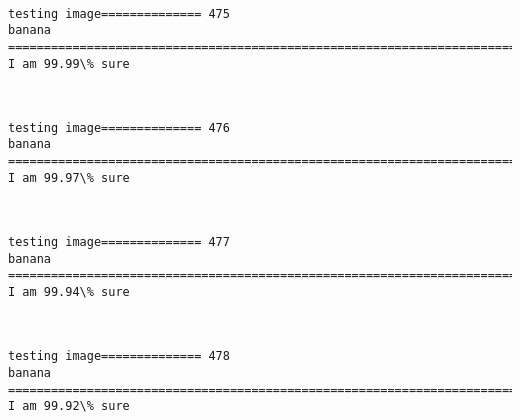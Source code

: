 \documentclass[11pt]{article}
\begin{document}
    \begin{center}
    \end{center}
    { \hspace*{\fill} \\}
    
    \begin{Verbatim}[commandchars=\\\{\}]
testing image============== 475
banana
============================================================================
I am 99.99\% sure

    \end{Verbatim}

    \begin{center}
    \end{center}
    { \hspace*{\fill} \\}
    
    \begin{Verbatim}[commandchars=\\\{\}]
testing image============== 476
banana
============================================================================
I am 99.97\% sure

    \end{Verbatim}

    \begin{center}
    \end{center}
    { \hspace*{\fill} \\}
    
    \begin{Verbatim}[commandchars=\\\{\}]
testing image============== 477
banana
============================================================================
I am 99.94\% sure

    \end{Verbatim}

    \begin{center}
    \end{center}
    { \hspace*{\fill} \\}
    
    \begin{Verbatim}[commandchars=\\\{\}]
testing image============== 478
banana
============================================================================
I am 99.92\% sure

    \end{Verbatim}
\end{document}
